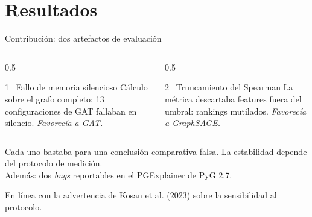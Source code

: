 \documentclass[aspectratio=169,11pt]{beamer}
\begin{document}
\section{Resultados}

\begin{frame}{Contribución: dos artefactos de evaluación}
\begin{columns}[T]
\begin{column}{0.5\textwidth}
\begin{alertblock}{1 \textperiodcentered\ Fallo de memoria silencioso}
\small Cálculo sobre el grafo completo: 13 configuraciones de GAT fallaban en silencio. \emph{Favorecía a GAT.}
\end{alertblock}
\end{column}
\begin{column}{0.5\textwidth}
\begin{alertblock}{2 \textperiodcentered\ Truncamiento del Spearman}
\small La métrica descartaba features fuera del umbral: rankings mutilados. \emph{Favorecía a GraphSAGE.}
\end{alertblock}
\end{column}
\end{columns}
\vspace{0.6em}
\begin{center}\small
\alert{Cada uno bastaba para una conclusión comparativa falsa.} La estabilidad depende del protocolo de medición.\\ Además: dos \emph{bugs} reportables en el PGExplainer de PyG 2.7.
\end{center}
\vspace{0.2em}
{\scriptsize\color{muted}\hfill En línea con la advertencia de Kosan et al. (2023) sobre la sensibilidad al protocolo.\hspace*{0.4cm}}
\end{frame}
\end{document}
